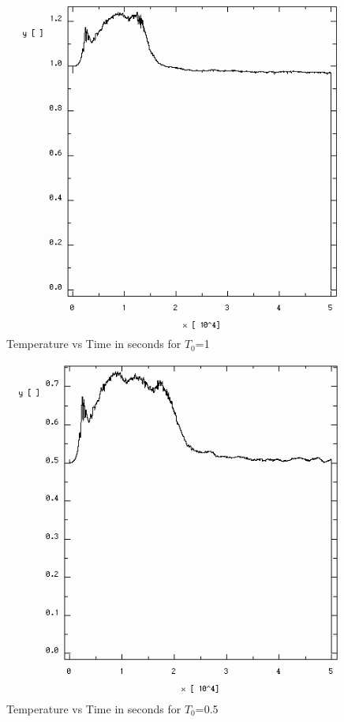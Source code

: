 \documentclass{article}
\begin{document}
\begin{multicols}{2}
\begin{figure}
\centering
\includegraphics[width=\linewidth]{./imgs/temp1_0}
\caption{Temperature vs Time in seconds for $T_0$=1}
\label{fig:temp5}
\end{figure}

\begin{figure}
\centering
\includegraphics[width=\linewidth]{./imgs/temp_5}
\caption{Temperature vs Time in seconds for $T_0$=0.5}
\label{fig:temp6}
\end{figure}


\end{multicols}
\end{document}
